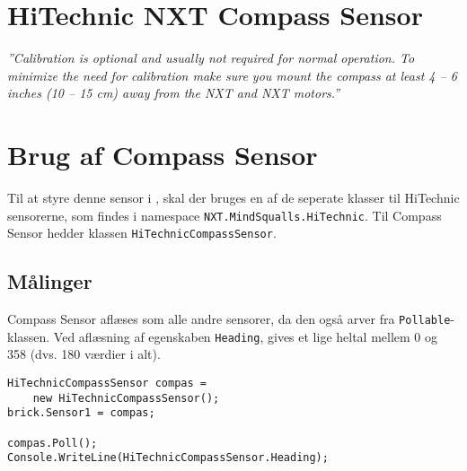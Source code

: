 
\section{HiTechnic NXT Compass Sensor}
\textit{''Calibration is optional and usually not required for normal operation. To minimize the need for calibration make sure you mount the compass at least 4 – 6 inches (10 – 15 cm) away from the NXT and NXT motors.''}

\section{Brug af Compass Sensor}
Til at styre denne sensor i \mindsqualls, skal der bruges en af de seperate klasser til HiTechnic sensorerne, som findes i namespace \lstinline[style=csharp]!NXT.MindSqualls.HiTechnic!.
Til Compass Sensor hedder klassen \lstinline[style=csharp]!HiTechnicCompassSensor!.

\subsection{Målinger}
Compass Sensor aflæses som alle andre sensorer, da den også arver fra \lstinline[style=csharp]!Pollable!-klassen.
Ved aflæsning af egenskaben \lstinline[style=csharp]!Heading!, gives et lige heltal mellem 0 og 358 (dvs. 180 værdier i alt).

\begin{lstlisting}[style=csharpsmall,caption={Et eksempel på brug af Compass Sensor},label=compass:example]
HiTechnicCompassSensor compas =
	new HiTechnicCompassSensor();
brick.Sensor1 = compas;

compas.Poll();
Console.WriteLine(HiTechnicCompassSensor.Heading);
\end{lstlisting}